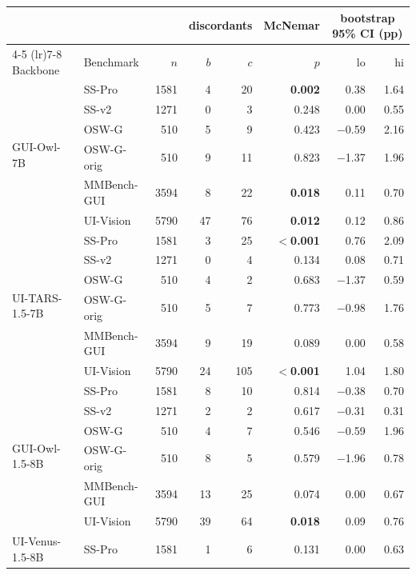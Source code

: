 \begin{table}[!htbp]
\centering\footnotesize\renewcommand{\arraystretch}{0.85}\setlength{\tabcolsep}{3pt}
\begin{tabular}{ll r rr r rr}
\toprule
 & & & \multicolumn{2}{c}{discordants} & \multicolumn{1}{c}{McNemar} & \multicolumn{2}{c}{bootstrap 95\% CI (pp)} \\
\cmidrule(lr){4-5} \cmidrule(lr){7-8}
Backbone & Benchmark & $n$ & $b$ & $c$ & $p$ & lo & hi \\
\midrule
\multirow{6}{*}{GUI-Owl-7B}
 & SS-Pro        & 1581 &  4 & 20 & \textbf{0.002} & 0.38 & 1.64 \\
 & SS-v2         & 1271 &  0 &  3 & 0.248 & 0.00 & 0.55 \\
 & OSW-G         &  510 &  5 &  9 & 0.423 & $-$0.59 & 2.16 \\
 & OSW-G-orig    &  510 &  9 & 11 & 0.823 & $-$1.37 & 1.96 \\
 & MMBench-GUI   & 3594 &  8 & 22 & \textbf{0.018} & 0.11 & 0.70 \\
 & UI-Vision     & 5790 & 47 & 76 & \textbf{0.012} & 0.12 & 0.86 \\
\midrule
\multirow{6}{*}{UI-TARS-1.5-7B}
 & SS-Pro        & 1581 &  3 & 25 & \textbf{$<$0.001} & 0.76 & 2.09 \\
 & SS-v2         & 1271 &  0 &  4 & 0.134 & 0.08 & 0.71 \\
 & OSW-G         &  510 &  4 &  2 & 0.683 & $-$1.37 & 0.59 \\
 & OSW-G-orig    &  510 &  5 &  7 & 0.773 & $-$0.98 & 1.76 \\
 & MMBench-GUI   & 3594 &  9 & 19 & 0.089 & 0.00 & 0.58 \\
 & UI-Vision     & 5790 & 24 &105 & \textbf{$<$0.001} & 1.04 & 1.80 \\
\midrule
\multirow{6}{*}{GUI-Owl-1.5-8B}
 & SS-Pro        & 1581 &  8 & 10 & 0.814 & $-$0.38 & 0.70 \\
 & SS-v2         & 1271 &  2 &  2 & 0.617 & $-$0.31 & 0.31 \\
 & OSW-G         &  510 &  4 &  7 & 0.546 & $-$0.59 & 1.96 \\
 & OSW-G-orig    &  510 &  8 &  5 & 0.579 & $-$1.96 & 0.78 \\
 & MMBench-GUI   & 3594 & 13 & 25 & 0.074 & 0.00 & 0.67 \\
 & UI-Vision     & 5790 & 39 & 64 & \textbf{0.018} & 0.09 & 0.76 \\
\midrule
\multirow{6}{*}{UI-Venus-1.5-8B}
 & SS-Pro        & 1581 &  1 &  6 & 0.131 & 0.00 & 0.63 \\

\end{tabular}
\end{table}
